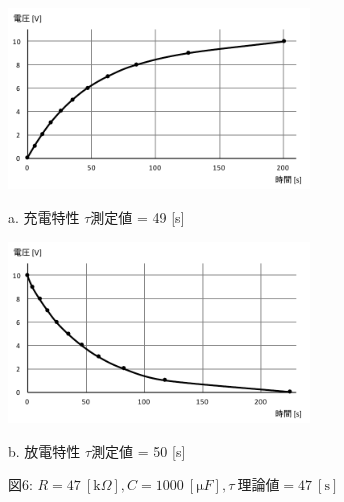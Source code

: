 \documentclass[uplatex]{jsarticle}
\begin{document}
			\begin{figure}[h]
				\begin{minipage}{0.5\hsize}
					\begin{center}
						\includegraphics[width = 8cm]{6-a.pdf}
					\end{center}
					\captionsetup{labelformat=empty,labelsep=none}
					\caption{a. 充電特性 $\tau$測定値 = 49 [s]}
				\end{minipage}
				\begin{minipage}{0.5\hsize}
					\begin{center}
						\includegraphics[width = 8cm]{6-b.pdf}
					\end{center}
					\captionsetup{labelformat=empty,labelsep=none}
					\caption{b. 放電特性 $\tau$測定値 = 50 [s]}
				\end{minipage}
				\captionsetup{labelformat=empty,labelsep=none}
				\caption{図6: $R = 47 \ [\mathrm k \Omega], C = 1000 \ [\mathrm \mu F], \tau \ 理論値 = 47 \ [\mathrm s]$}
			\end{figure}
\end{document}
